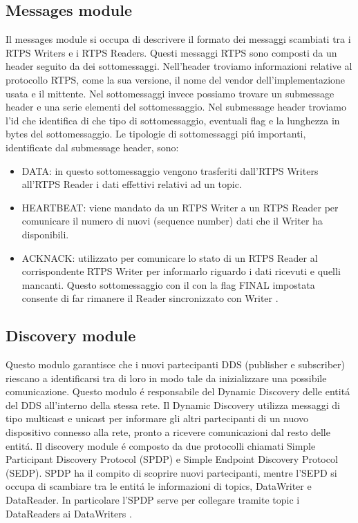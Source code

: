 \subsection{Messages module}
Il messages module si occupa di descrivere il formato dei messaggi scambiati
tra i RTPS Writers e i RTPS Readers. Questi messaggi RTPS sono composti da un header
seguito da dei sottomessaggi. Nell'header troviamo informazioni relative al
protocollo RTPS, come la sua versione, il nome del vendor dell'implementazione
usata e il mittente. Nel sottomessaggi invece possiamo trovare un submessage
header e una serie elementi del sottomessaggio. Nel submessage header 
troviamo l'id che 
identifica di che tipo di sottomessaggio, eventuali flag e la lunghezza in bytes 
del sottomessaggio. Le tipologie di sottomessaggi piú importanti, identificate
dal submessage header, sono:
\begin{itemize}
    \item DATA: in questo sottomessaggio vengono trasferiti dall'RTPS Writers
    all'RTPS Reader i dati effettivi relativi ad un topic.
    \item HEARTBEAT: viene mandato da un RTPS Writer a un RTPS Reader per 
    comunicare il numero di nuovi (sequence number) dati che il 
    Writer ha disponibili.
    \item ACKNACK: utilizzato per comunicare lo stato di un RTPS Reader 
    al corrispondente RTPS Writer per informarlo riguardo i dati ricevuti
    e quelli mancanti. Questo sottomessaggio con il con la flag FINAL 
    impostata consente di far rimanere il Reader sincronizzato con 
    Writer \cite{ddsrtps}.
\end{itemize}


\subsection{Discovery module}
Questo modulo garantisce che i nuovi partecipanti DDS (publisher e subscriber)
riescano a identificarsi tra di loro in modo tale da inizializzare una 
possibile comunicazione. Questo modulo é responsabile del Dynamic Discovery
delle entitá del DDS all'interno della stessa rete. Il Dynamic Discovery
utilizza messaggi di tipo multicast e unicast per informare gli altri partecipanti
di un nuovo dispositivo connesso alla rete, pronto a ricevere comunicazioni
dal resto delle entitá. Il discovery module é composto da due protocolli chiamati
Simple Participant Discovery Protocol (SPDP) e 
Simple Endpoint Discovery Protocol (SEDP). SPDP ha il compito di scoprire nuovi 
partecipanti, mentre l'SEPD si occupa di scambiare tra le entitá le informazioni
di topics, DataWriter e DataReader. In particolare l'SPDP serve per collegare
tramite topic i DataReaders ai DataWriters \cite{ddsrtps}.


